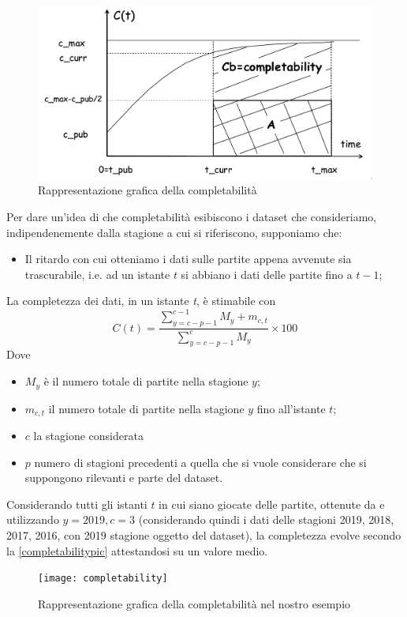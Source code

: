 \begin{figure}
\caption{Rappresentazione grafica della completabilità \cite{batini2006}}
\label{completabilitypic_gen}
\includegraphics[width=\linewidth]{completability_gen.png}
\end{figure}

\par

Per dare un'idea di che completabilità esibiscono i dataset che consideriamo, indipendenemente dalla stagione a cui si riferiscono, supponiamo che:


\begin{itemize}
	\item Il ritardo con cui otteniamo i dati sulle partite appena avvenute sia trascurabile, i.e. ad un istante $t$ si abbiano i dati delle partite fino a $t-1$;
\end{itemize}
	La completezza dei dati, in un istante \textit{t}, è stimabile con 
	\begin{equation}
	C(t) = \frac{\sum\limits_{y=c-p-1}^{c-1} M_{y} + m_{c,t}}{\sum\limits_{y=c-p-1}^{c} M_{y}} \times 100
	\end{equation}
	Dove \begin{itemize}
		\item $M_y$ è il numero totale di partite nella stagione $y$;
		\item $m_{c,t}$ il numero totale di partite nella stagione $y$ fino all'istante $t$;
		\item $c$ la stagione considerata
		\item $p$ numero di stagioni precedenti a quella che si vuole considerare che si suppongono rilevanti e parte del dataset.
	\end{itemize}

Considerando tutti gli istanti $t$ in cui siano giocate delle partite, ottenute da \cite{nba_schedule} e utilizzando $y = 2019, c = 3$ (considerando quindi i dati delle stagioni 2019, 2018, 2017, 2016, con 2019 stagione oggetto del dataset), la completezza evolve secondo la \autoref{completabilitypic} attestandosi su un valore medio.

\begin{figure}
\caption{Rappresentazione grafica della completabilità nel nostro esempio}
\label{completabilitypic}
\texttt{[image: completability]}
\end{figure}